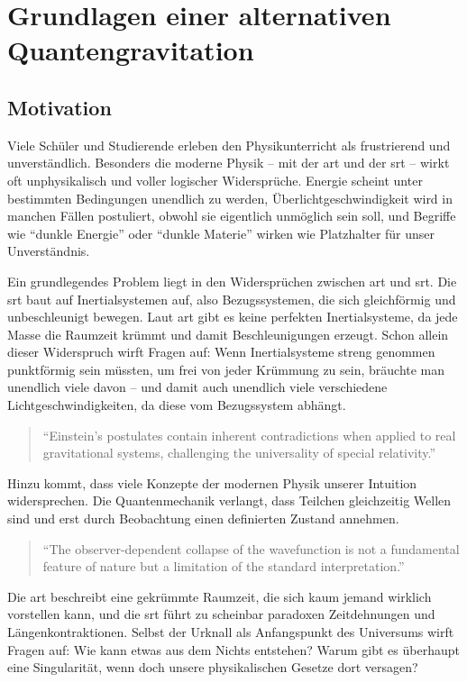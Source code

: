 \chapter{Grundlagen einer alternativen Quantengravitation}
\section{Motivation}
Viele Schüler und Studierende erleben den Physikunterricht als frustrierend und unverständlich. Besonders die moderne Physik – mit der \gls{art}
und der \gls{srt} – wirkt oft unphysikalisch und voller logischer Widersprüche. Energie scheint unter bestimmten Bedingungen unendlich zu werden,
Überlichtgeschwindigkeit wird in manchen Fällen postuliert, obwohl sie eigentlich unmöglich sein soll, und Begriffe wie \enquote{dunkle Energie} oder \enquote{dunkle Materie} wirken wie
Platzhalter für unser Unverständnis.

Ein grundlegendes Problem liegt in den Widersprüchen zwischen \gls{art} und \gls{srt}. Die \gls{srt} baut auf Inertialsystemen auf, also Bezugssystemen, die sich gleichförmig und unbeschleunigt
bewegen. Laut \gls{art} gibt es keine perfekten Inertialsysteme, da jede Masse die Raumzeit krümmt und damit Beschleunigungen erzeugt. Schon allein dieser Widerspruch wirft
Fragen auf: Wenn Inertialsysteme streng genommen punktförmig sein müssten, um frei von jeder Krümmung zu sein, bräuchte man unendlich viele davon – und damit auch unendlich
viele verschiedene Lichtgeschwindigkeiten, da diese vom Bezugssystem abhängt.
\begin{quote}
    \enquote{Einstein's postulates contain inherent contradictions when applied to real gravitational systems, challenging the universality of special relativity.} \cite{Rubcic1998}
\end{quote}
Hinzu kommt, dass viele Konzepte der modernen Physik unserer Intuition widersprechen. Die Quantenmechanik verlangt, dass Teilchen gleichzeitig Wellen sind und erst durch
Beobachtung einen definierten Zustand annehmen.
\begin{quote}
    \enquote{The observer-dependent collapse of the wavefunction is not a fundamental feature of nature but a limitation of the standard interpretation.} \cite{bohm1952}
\end{quote}
Die \gls{art} beschreibt eine gekrümmte Raumzeit, die sich kaum jemand wirklich vorstellen kann, und die \gls{srt} führt zu scheinbar
paradoxen Zeitdehnungen und Längenkontraktionen. Selbst der Urknall als Anfangspunkt des Universums wirft Fragen auf: Wie kann etwas aus dem Nichts entstehen? Warum gibt es
überhaupt eine Singularität, wenn doch unsere physikalischen Gesetze dort versagen?

